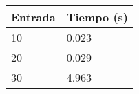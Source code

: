  \begin{center}
\begin{tabular}{|l|l|} \hline 
\bf{Entrada} & \bf{Tiempo (s)} \\ \hline 
10 & 0.023	 \\ \hline 
20 & 0.029	 \\ \hline
30 & 4.963 \\ \hline 
\end{tabular}
\end{center}



